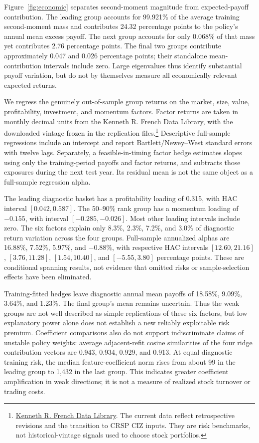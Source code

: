\documentclass[12pt,letterpaper]{article}
\begin{document}
Figure~\ref{fig:economic} separates second-moment magnitude from expected-payoff contribution. The leading group accounts for 99.921\% of the average training second-moment mass and contributes 24.32 percentage points to the policy's annual mean excess payoff. The next group accounts for only 0.068\% of that mass yet contributes 2.76 percentage points. The final two groups contribute approximately 0.047 and 0.026 percentage points; their standalone mean-contribution intervals include zero. Large eigenvalues thus identify substantial payoff variation, but do not by themselves measure all economically relevant expected returns.

We regress the genuinely out-of-sample group returns on the market, size, value, profitability, investment, and momentum factors. Factor returns are taken in monthly decimal units from the Kenneth R. French Data Library, with the downloaded vintage frozen in the replication files.\footnote{\href{https://mba.tuck.dartmouth.edu/pages/faculty/ken.french/data_library.html}{Kenneth R. French Data Library}. The current data reflect retrospective revisions and the transition to CRSP CIZ inputs. They are risk benchmarks, not historical-vintage signals used to choose stock portfolios.} Descriptive full-sample regressions include an intercept and report Bartlett/Newey--West standard errors with twelve lags. Separately, a feasible-in-timing factor hedge estimates slopes using only the training-period payoffs and factor returns, and subtracts those exposures during the next test year. Its residual mean is not the same object as a full-sample regression alpha.

The leading diagnostic basket has a profitability loading of 0.315, with HAC interval $[0.042,0.587]$. The 50--90\% rank group has a momentum loading of $-0.155$, with interval $[-0.285,-0.026]$. Most other loading intervals include zero. The six factors explain only 8.3\%, 2.3\%, 7.2\%, and 3.0\% of diagnostic return variation across the four groups. Full-sample annualized alphas are 16.88\%, 7.52\%, 5.97\%, and $-0.88$\%, with respective HAC intervals $[12.60,21.16]$, $[3.76,11.28]$, $[1.54,10.40]$, and $[-5.55,3.80]$ percentage points. These are conditional spanning results, not evidence that omitted risks or sample-selection effects have been eliminated.

Training-fitted hedges leave diagnostic annual mean payoffs of 18.58\%, 9.09\%, 3.64\%, and 1.23\%. The final group's mean remains uncertain. Thus the weak groups are not well described as simple replications of these six factors, but low explanatory power alone does not establish a new reliably exploitable risk premium. Coefficient comparisons also do not support indiscriminate claims of unstable policy weights: average adjacent-refit cosine similarities of the four ridge contribution vectors are 0.943, 0.934, 0.929, and 0.913. At equal diagnostic training risk, the median feature-coefficient norm rises from about 99 in the leading group to 1,432 in the last group. This indicates greater coefficient amplification in weak directions; it is not a measure of realized stock turnover or trading costs.
\end{document}
